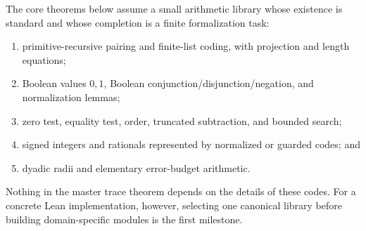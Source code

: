 The core theorems below assume a small arithmetic library whose existence is
standard and whose completion is a finite formalization task:

\begin{enumerate}
\item primitive-recursive pairing and finite-list coding, with projection and
      length equations;
\item Boolean values \(0,1\), Boolean conjunction/disjunction/negation, and
      normalization lemmas;
\item zero test, equality test, order, truncated subtraction, and bounded
      search;
\item signed integers and rationals represented by normalized or guarded
      codes; and
\item dyadic radii and elementary error-budget arithmetic.
\end{enumerate}

Nothing in the master trace theorem depends on the details of these codes.
For a concrete Lean implementation, however, selecting one canonical library
before building domain-specific modules is the first milestone.
